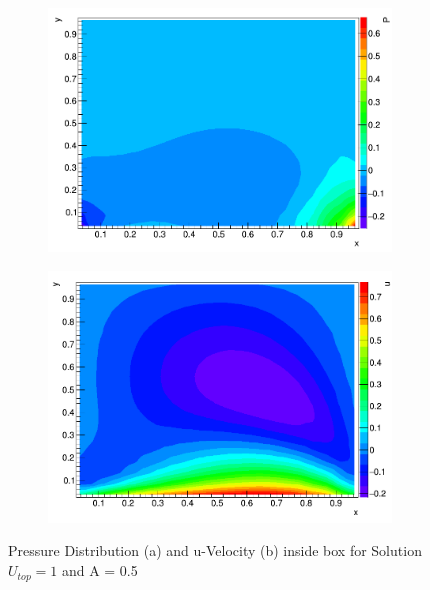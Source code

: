 \documentclass[paper=a4, fontsize=11pt, abstract=on]{scrartcl}
\numberwithin{equation}{section}		%
\numberwithin{figure}{section}			%
\numberwithin{table}{section}				%
\begin{document}
\begin{figure}[H]
        \centering
        \begin{subfigure}[h]{1.0\textwidth}
        \centering
                \includegraphics[width = 12.5cm]{con2}
                \caption{}
				
        \end{subfigure}%
        \newline
       \centering
        \begin{subfigure}[h]{0.9\textwidth}
        \centering
                \includegraphics[width = 12.5cm]{con4}
                \caption{}
                
        \end{subfigure}
        \caption{Pressure Distribution (a) and u-Velocity (b) inside box for Solution $U_{top}=1$ and A = 0.5}
        \label{zero}
\end{figure}
\end{document}
